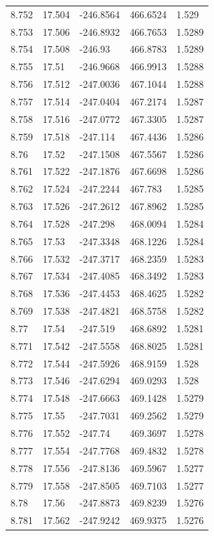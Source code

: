 \begin{tabular}{lllll}
8.752 & 17.504 & -246.8564 & 466.6524 & 1.529 \\
8.753 & 17.506 & -246.8932 & 466.7653 & 1.5289 \\
8.754 & 17.508 & -246.93 & 466.8783 & 1.5289 \\
8.755 & 17.51 & -246.9668 & 466.9913 & 1.5288 \\
8.756 & 17.512 & -247.0036 & 467.1044 & 1.5288 \\
8.757 & 17.514 & -247.0404 & 467.2174 & 1.5287 \\
8.758 & 17.516 & -247.0772 & 467.3305 & 1.5287 \\
8.759 & 17.518 & -247.114 & 467.4436 & 1.5286 \\
8.76 & 17.52 & -247.1508 & 467.5567 & 1.5286 \\
8.761 & 17.522 & -247.1876 & 467.6698 & 1.5286 \\
8.762 & 17.524 & -247.2244 & 467.783 & 1.5285 \\
8.763 & 17.526 & -247.2612 & 467.8962 & 1.5285 \\
8.764 & 17.528 & -247.298 & 468.0094 & 1.5284 \\
8.765 & 17.53 & -247.3348 & 468.1226 & 1.5284 \\
8.766 & 17.532 & -247.3717 & 468.2359 & 1.5283 \\
8.767 & 17.534 & -247.4085 & 468.3492 & 1.5283 \\
8.768 & 17.536 & -247.4453 & 468.4625 & 1.5282 \\
8.769 & 17.538 & -247.4821 & 468.5758 & 1.5282 \\
8.77 & 17.54 & -247.519 & 468.6892 & 1.5281 \\
8.771 & 17.542 & -247.5558 & 468.8025 & 1.5281 \\
8.772 & 17.544 & -247.5926 & 468.9159 & 1.528 \\
8.773 & 17.546 & -247.6294 & 469.0293 & 1.528 \\
8.774 & 17.548 & -247.6663 & 469.1428 & 1.5279 \\
8.775 & 17.55 & -247.7031 & 469.2562 & 1.5279 \\
8.776 & 17.552 & -247.74 & 469.3697 & 1.5278 \\
8.777 & 17.554 & -247.7768 & 469.4832 & 1.5278 \\
8.778 & 17.556 & -247.8136 & 469.5967 & 1.5277 \\
8.779 & 17.558 & -247.8505 & 469.7103 & 1.5277 \\
8.78 & 17.56 & -247.8873 & 469.8239 & 1.5276 \\
8.781 & 17.562 & -247.9242 & 469.9375 & 1.5276 \\

\end{tabular}

